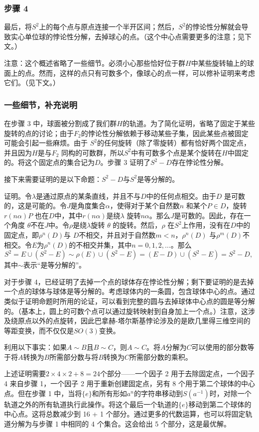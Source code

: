 \subsubsection{步骤 4}  
最后，将\( S^2 \)上的每个点与原点连接一个半开区间；然后，\( S^2 \)的悖论性分解就会导致实心单位球的悖论性分解，去掉球心的点。（这个中心点需要更多的注意；见下文。）

注意：这个概述省略了一些细节。必须小心那些恰好位于群\( H \)中某些旋转轴上的球面上的点。然而，这样的点只有可数多个，像球心的点一样，可以修补证明来考虑它们。（见下文。）
\subsubsection{一些细节，补充说明}  
在步骤 3 中，球面被分割成了我们群\( H \)的轨道。为了简化证明，省略了固定于某些旋转的点的讨论；由于\( F_2 \)的悖论性分解依赖于移动某些子集，因此某些点被固定可能会引起一些麻烦。由于 \( S^2 \)的任何旋转（除了零旋转）都有恰好两个固定点，并且因为\( H \)是与\( F_2 \) 同构的可数群，所以\( S^2 \)中有可数多个点是某个旋转在\( H \)中固定的。将这个固定点的集合记为\( D \)。步骤 3 证明了\( S^2 - D \)存在悖论性分解。

接下来需要证明的是以下命题：\( S^2 - D \)与\( S^2 \)是等分解的。

证明。令\( \lambda \)是通过原点的某条直线，并且不与\( D \)中的任何点相交。由于\( D \) 是可数的，这是可能的。令\( J \)是角度集合\( \alpha \)，使得对于某个自然数\( n \) 和某个\( P \in D \)，旋转\( r(n\alpha)P \) 也在\( D \)中，其中\( r(n\alpha) \)是绕\( \lambda \) 旋转\( n\alpha \)。那么\( J \)是可数的。因此，存在一个角度 \( \theta\)不在\( J \)中。令\( \rho \)是绕\( \lambda \)旋转 \( \theta \) 的旋转。然后，\( \rho \) 在\( S^2 \)上作用，没有在\( D \)中的固定点，即\( \rho^n(D) \)与 \( D \)不相交，并且对于自然数\( m < n \)，\( \rho^n(D) \) 与\( \rho^m(D) \)不相交。令\( E \)为\( \rho^n(D) \)的不相交并集，其中\( n = 0, 1, 2, \dots \)。那么  
\[
S^2 = E \cup (S^2 - E) \sim \rho(E) \cup (S^2 - E) = (E - D) \cup (S^2 - E) = S^2 - D,~
\]
其中\( \sim \)表示“是等分解的”。

对于步骤 4，已经证明了去掉一个点的球体存在悖论性分解；剩下要证明的是去掉一个点的球体与球体是等分解的。考虑球体内的一条圆，包含球体中心的点。通过类似于证明命题时所用的论证，可以看到完整的圆与去掉球体中心点的圆是等分解的。（基本上，圆上的可数个点可以通过旋转映射到自身加上一个点。）注意，这涉及绕原点以外的点旋转，因此巴拿赫-塔尔斯基悖论涉及的是欧几里得三维空间的等距变换，而不仅仅是\( SO(3) \)变换。

利用以下事实：如果\( A \sim B \)且\( B \sim C \)，则\( A \sim C \)。将\( A \)分解为\( C \)可以使用的部分数等于将\( A \)转换为\( B \)所需部分数与将\( B \)转换为\( C \)所需部分数的乘积。

上述证明需要\( 2 \times 4 \times 2 + 8 = 24 \)个部分——一个因子 2 用于去除固定点，一个因子 4 来自步骤 1，一个因子 2 用于重新创建固定点，另有 8 个用于第二个球体的中心点。但在步骤 1 中，当将\( \{e\} \)和所有形如\( a^n \)的字符串移动到\( S(a^{-1}) \)时，对除一个轨道之外的所有轨道执行此操作。将这个最后一个轨道的\( \{e\} \)移动到第二个球体的中心点。这将总数减少到 16 + 1 个部分。通过更多的代数运算，也可以将固定轨道分解为与步骤 1 中相同的 4 个集合。这会给出 5 个部分，这是最优解。